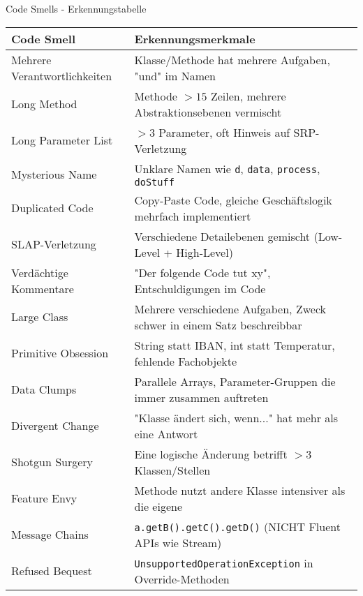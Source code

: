 \begin{frame}{Code Smells - Erkennungstabelle}
  \footnotesize
  \renewcommand{\arraystretch}{1.15}
  \begin{tabular}{|l|l|}
    \hline
    \textbf{Code Smell} & \textbf{Erkennungsmerkmale} \\
    \hline
    \hline
    Mehrere Verantwortlichkeiten & Klasse/Methode hat mehrere Aufgaben, "und" im Namen \\
    \hline
    Long Method & Methode $>15$ Zeilen, mehrere Abstraktionsebenen vermischt \\
    \hline
    Long Parameter List & $>3$ Parameter, oft Hinweis auf SRP-Verletzung \\
    \hline
    Mysterious Name & Unklare Namen wie \texttt{d}, \texttt{data}, \texttt{process}, \texttt{doStuff} \\
    \hline
    Duplicated Code & Copy-Paste Code, gleiche Geschäftslogik mehrfach implementiert \\
    \hline
    SLAP-Verletzung & Verschiedene Detailebenen gemischt (Low-Level + High-Level) \\
    \hline
    Verdächtige Kommentare & "Der folgende Code tut xy", Entschuldigungen im Code \\
    \hline
    \hline
    Large Class & Mehrere verschiedene Aufgaben, Zweck schwer in einem Satz beschreibbar \\
    \hline
    Primitive Obsession & String statt IBAN, int statt Temperatur, fehlende Fachobjekte \\
    \hline
    Data Clumps & Parallele Arrays, Parameter-Gruppen die immer zusammen auftreten \\
    \hline
    Divergent Change & "Klasse ändert sich, wenn..." hat mehr als eine Antwort \\
    \hline
    Shotgun Surgery & Eine logische Änderung betrifft $>3$ Klassen/Stellen \\
    \hline
    Feature Envy & Methode nutzt andere Klasse intensiver als die eigene \\
    \hline
    Message Chains & \texttt{a.getB().getC().getD()} (NICHT Fluent APIs wie Stream) \\
    \hline
    Refused Bequest & \texttt{UnsupportedOperationException} in Override-Methoden \\
    \hline
  \end{tabular}
\end{frame}

